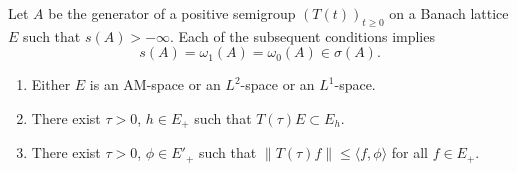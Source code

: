 \begin{theorem}\label{thm:c4-1.1}
Let $A$ be the generator of a positive semigroup $(T(t))_{t \geq 0}$ on a Banach lattice $E$ such that $s(A) > -\infty$.
Each of the subsequent conditions implies
\begin{equation*}\label{eq:c4-1.0-kgk}
s(A) = \omega_{1}(A) = \omega_{0}(A) \in \sigma(A) .
\end{equation*}
\begin{enumerate}[\upshape (i)] 
    \item \label{thm:c4-1.1-1}
    Either $E$ is an AM-space or an $L^{2}$-space or an $L^{1}$-space.
    
    \item \label{thm:c4-1.1-2}
    There exist $\tau > 0$, $h \in E_{+}$ such that $T(\tau)E \subset E_{h}$.
    
    \item \label{thm:c4-1.1-3}
    There exist $\tau > 0$, $\phi \in E'_{+}$ such that $\|T(\tau)f\| \leq \langle f,\phi\rangle$ for all $f \in E_{+}$.
\end{enumerate}
\end{theorem}
